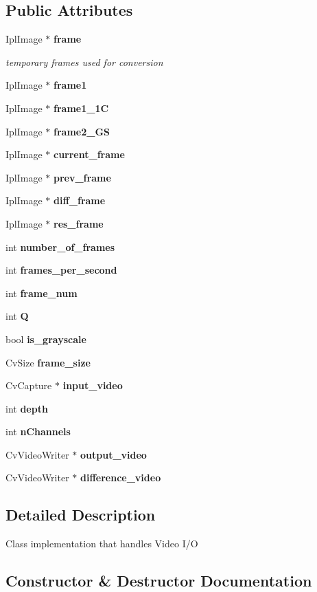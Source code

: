 \subsection*{Public Attributes}
\begin{CompactItemize}
\item 
IplImage $\ast$ {\bf frame}
\begin{CompactList}\small\item\em temporary frames used for conversion \item\end{CompactList}\item 
IplImage $\ast$ {\bf frame1}
\item 
IplImage $\ast$ {\bf frame1\_\-1C}
\item 
IplImage $\ast$ {\bf frame2\_\-GS}
\item 
IplImage $\ast$ {\bf current\_\-frame}
\item 
IplImage $\ast$ {\bf prev\_\-frame}
\item 
IplImage $\ast$ {\bf diff\_\-frame}
\item 
IplImage $\ast$ {\bf res\_\-frame}
\item 
int {\bf number\_\-of\_\-frames}
\item 
int {\bf frames\_\-per\_\-second}
\item 
int {\bf frame\_\-num}
\item 
int {\bf Q}
\item 
bool {\bf is\_\-grayscale}
\item 
CvSize {\bf frame\_\-size}
\item 
CvCapture $\ast$ {\bf input\_\-video}
\item 
int {\bf depth}
\item 
int {\bf nChannels}
\item 
CvVideoWriter $\ast$ {\bf output\_\-video}
\item 
CvVideoWriter $\ast$ {\bf difference\_\-video}
\end{CompactItemize}


\subsection{Detailed Description}
Class implementation that handles Video I/O 



\subsection{Constructor \& Destructor Documentation}
